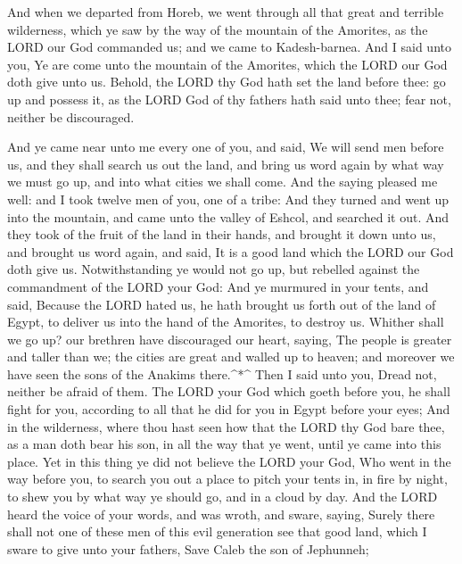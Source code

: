  And when we departed from Horeb, we went through all that
great and terrible wilderness, which ye saw by the way of the mountain
of the Amorites, as the LORD our God commanded us; and we came to
Kadesh-barnea.  And I said unto you, Ye are come unto the
mountain of the Amorites, which the LORD our God doth give unto us.
 Behold, the LORD thy God hath set the land before thee: go
up and possess it, as the LORD God of thy fathers hath said unto thee;
fear not, neither be discouraged.

 And ye came near unto me every one of you, and said, We
will send men before us, and they shall search us out the land, and
bring us word again by what way we must go up, and into what cities we
shall come.  And the saying pleased me well: and I took
twelve men of you, one of a tribe:  And they turned and
went up into the mountain, and came unto the valley of Eshcol, and
searched it out.  And they took of the fruit of the land in
their hands, and brought it down unto us, and brought us word again, and
said, It is a good land which the LORD our God doth give us.
 Notwithstanding ye would not go up, but rebelled against
the commandment of the LORD your God:  And ye murmured in
your tents, and said, Because the LORD hated us, he hath brought us
forth out of the land of Egypt, to deliver us into the hand of the
Amorites, to destroy us.  Whither shall we go up? our
brethren have discouraged our heart, saying, The people is greater and
taller than we; the cities are great and walled up to heaven; and
moreover we have seen the sons of the Anakims there.\^{}*\^{}
 Then I said unto you, Dread not, neither be afraid of
them.  The LORD your God which goeth before you, he shall
fight for you, according to all that he did for you in Egypt before your
eyes;  And in the wilderness, where thou hast seen how that
the LORD thy God bare thee, as a man doth bear his son, in all the way
that ye went, until ye came into this place.  Yet in this
thing ye did not believe the LORD your God,  Who went in
the way before you, to search you out a place to pitch your tents in, in
fire by night, to shew you by what way ye should go, and in a cloud by
day.  And the LORD heard the voice of your words, and was
wroth, and sware, saying,  Surely there shall not one of
these men of this evil generation see that good land, which I sware to
give unto your fathers,  Save Caleb the son of Jephunneh;
